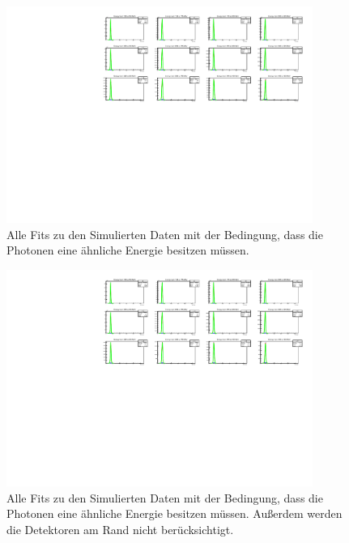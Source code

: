 \documentclass[a4paper,11pt,oneside,final,german,openbib,pdftex]{scrbook}
\begin{document}
{\begin{appendix}
\begin{figure}[h!]
	\begin{center}
		\includegraphics[width=100mm]{20171804NoCutAllFits}
		\caption{Alle Fits zu den Simulierten Daten mit der Bedingung, dass die Photonen eine \"ahnliche Energie besitzen m\"ussen.}
		\label{fig:Sim-No-Cut-All-Fits}
	\end{center}
\end{figure}


\begin{figure}[h!]
	\begin{center}
		\includegraphics[width=100mm]{2017180430DegreeCut}
		\caption{Alle Fits zu den Simulierten Daten mit der Bedingung, dass die Photonen eine \"ahnliche Energie besitzen m\"ussen. Au{\ss}erdem werden die Detektoren am Rand nicht ber\"ucksichtigt.}
		\label{fig:Sim-30-Degree-Cut-All-Fits}
	\end{center}
\end{figure}



\end{appendix}}
\end{document}
